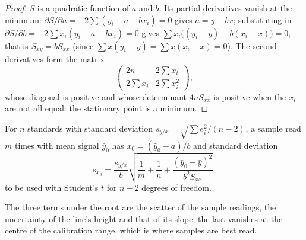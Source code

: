 \begin{proof}
$S$ is a quadratic function of $a$ and $b$. Its partial derivatives vanish at the minimum:
$\partial S/\partial a = -2\sum(y_i - a - bx_i) = 0$ gives $a = \bar y - b\bar x$; substituting in
$\partial S/\partial b = -2\sum x_i(y_i - a - bx_i) = 0$ gives $\sum x_i\bigl((y_i - \bar y) - b(x_i -
\bar x)\bigr) = 0$, that is $S_{xy} = bS_{xx}$ (since $\sum \bar x(y_i - \bar y) = \sum \bar x(x_i - \bar
x) = 0$). The second derivatives form the matrix
\[\begin{pmatrix} 2n & 2\sum x_i\\ 2\sum x_i & 2\sum x_i^2\end{pmatrix},\]
whose diagonal is positive and whose determinant $4nS_{xx}$ is positive when the $x_i$ are not all
equal: the stationary point is a minimum.
\end{proof}

\begin{proposition}\label{prop:b2:measurement-statistics:interpolation}
For $n$ standards with  standard deviation $s_{y/x} = \sqrt{\sum e_i^2/(n-2)}$, a sample read
$m$ times with mean signal $\bar y_0$ has $x_0 = (\bar y_0 - a)/b$ and standard deviation
\begin{equation*}
s_{x_0} = \frac{s_{y/x}}{b}\sqrt{\frac1m + \frac1n + \frac{(\bar y_0 - \bar y)^2}{b^2S_{xx}}},
\end{equation*}
to be used with Student's $t$ for $n - 2$ degrees of freedom.
\end{proposition}

\admitted

The three terms under the root are the scatter of the sample readings, the uncertainty of the line's
height and that of its slope; the last vanishes at the centre of the calibration range, which is where
samples are best read.

